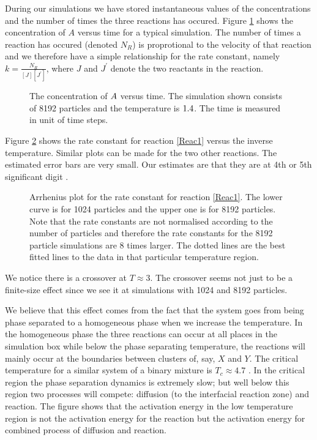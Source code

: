 During our simulations we have stored instantaneous values of the 
concentrations and the number of times the three reactions has
occured. Figure \ref{FigConc} shows the concentration of $A$ versus
time for a typical simulation.
The number of
times a reaction has occured (denoted $N_R$) is proprotional to the
velocity of that reaction 
and we therefore have a simple relationship for the rate constant, namely
$k = \frac{N_R}{[J][J^{\prime}]}$,
where $J$ and $J^{\prime}$ denote the two reactants in the reaction.

\begin{figure}
  
  \caption{The concentration of \protect$A\protect$ versus time. The
simulation shown consists of 8192 particles and the temperature is
\protect$1.4\protect$. The time is measured in unit of time
steps.\label{FigConc}} 
\end{figure}


Figure \ref{ArrhPlot} shows the rate constant for reaction \ref{Reac1}
versus the inverse tempera\-ture. Similar plots can be made for the two
other reactions. The estimated error bars are very small. Our estimates
are that they are at 4th or 5th significant digit \cite{Blocking}.

\begin{figure}[t]
  
  \caption{Arrhenius plot for the rate constant for reaction \ref{Reac1}.
  The lower curve is for 1024 particles and the upper one is for 8192
  particles. Note that the rate constants are not normalised according 
  to the number of particles and therefore the rate constants for the
  8192 particle simulations are 8 times larger. The dotted lines are
  the best fitted lines to the data in that particular temperature
  region.\label{ArrhPlot}}
\end{figure}

We notice there is a crossover at $T \approx 3$. The crossover seems not 
just to be a finite-size effect since we see it at simulations with 1024 and 
8192 particles.

We believe that this effect comes from the fact that the system goes from 
being phase separated to a homogeneous phase when we increase the 
temperature. In the homogeneous phase the
three reactions can occur at all places in the simulation box while below
the phase separating temperature, the reactions will mainly occur at the 
boundaries between clusters of, say, $X$ and $Y$. The critical
temperature for a similar system of a binary mixture is $T_{c} \approx
4.7$ \cite{tox3}. In the critical region the phase separation dynamics
is extremely slow; but well below this region two processes will
compete: diffusion (to the interfacial reaction zone) and
reaction. The figure shows that the activation energy in the low
temperature region is not the activation energy for the reaction but
the activation energy for combined process of diffusion and reaction.

